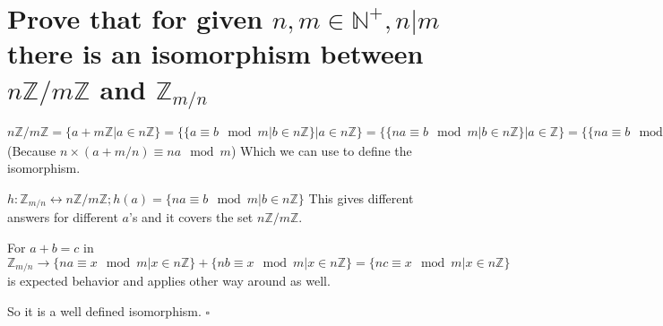 \documentclass[11pt]{article}
\begin{document}
    \part*{Prove that for given $n, m \in \mathbb{N^+}, n | m$ there is an isomorphism between $n\mathbb{Z}/m\mathbb{Z}$ and $\mathbb{Z}_{m/n}$ }

    $n\mathbb{Z}/m\mathbb{Z} = \{a + m\mathbb{Z} | a \in n\mathbb{Z}\} = \{\{a \equiv b \mod m | b \in n\mathbb{Z}\} | a \in n\mathbb{Z}\} = \{\{na \equiv b \mod m | b \in n\mathbb{Z}\} | a \in \mathbb{Z}\} = \{\{na \equiv b \mod m | b \in n\mathbb{Z}\} | a \in \mathbb{Z}_{m/n}\}$
    (Because $n \times (a + m/n) \equiv na \mod m$)
    Which we can use to define the isomorphism.

    $h: \mathbb{Z}_{m/n} \leftrightarrow n\mathbb{Z}/m\mathbb{Z}; h(a) = \{na \equiv b \mod m | b \in n\mathbb{Z}\}$
    This gives different answers for different $a$'s and it covers the set
    $n\mathbb{Z}/m\mathbb{Z}$.

    For $a + b = c$ in $\mathbb{Z}_{m/n} \longrightarrow \{na \equiv x \mod m | x \in n\mathbb{Z}\} + \{nb \equiv x \mod m | x \in n\mathbb{Z}\} = \{nc \equiv x \mod m | x \in n\mathbb{Z}\}$ is expected behavior and applies other way around as well.

    So it is a well defined isomorphism. $\square$
\end{document}
